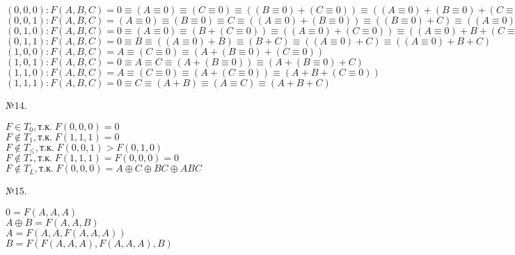 \documentclass[a4paper,12pt]{report} %
\begin{document}
\begin{flushleft}
$ (0,0,0): F(A,B,C) = 0 \equiv (A \equiv 0) \equiv (C \equiv 0) \equiv ((B \equiv 0)+(C \equiv 0)) \equiv ((A \equiv 0)+(B \equiv 0) + (C \equiv 0))$ \\
$ (0,0,1): F(A,B,C) = (A \equiv 0) \equiv (B \equiv 0) \equiv C \equiv ((A \equiv 0)+(B \equiv 0)) \equiv ((B \equiv 0)+ C) \equiv((A \equiv 0) + (B \equiv 0) + C) $ \\
$ (0,1,0): F(A,B,C) = 0 \equiv (A \equiv 0) \equiv (B + (C \equiv 0)) \equiv ((A \equiv 0) + (C \equiv 0)) \equiv ((A \equiv 0) + B + (C \equiv 0))$ \\
$ (0,1,1): F(A,B,C) = 0 \equiv B \equiv ((A \equiv 0)+B)\equiv (B + C)\equiv((A \equiv 0) + C) \equiv ((A \equiv 0)+B+C)$ \\
$ (1,0,0): F(A,B,C) = A \equiv (C \equiv 0) \equiv (A + (B \equiv 0)+ (C \equiv 0))$ \\
$ (1,0,1): F(A,B,C) =0 \equiv A \equiv C \equiv(A + (B \equiv 0)) \equiv (A + (B \equiv 0)+C)$ \\
$ (1,1,0): F(A,B,C) = A \equiv (C \equiv 0) \equiv (A + (C \equiv0)) \equiv (A + B+(C \equiv 0))$ \\
$ (1,1,1): F(A,B,C) = 0 \equiv C \equiv (A+ B)\equiv (A \equiv C) \equiv (A+B+C)$ \\
\end{flushleft}
\begin{center} 
№14.  
\end{center}
\begin{flushleft}
$F \in{T_0}, \text{т.к.}\; F(0,0,0)=0 $ \\
$F \notin{T_1},\text{т.к.}\; F(1,1,1)=0 $ \\
$F \notin{T_\leq}, \text{т.к.}\; F(0,0,1)>F(0,1,0) $ \\
$F \notin{T_*}, \text{т.к.}\; F(1,1,1)=F(0,0,0) = 0 $ \\
$F \notin{T_L}, \text{т.к.}\; F(0,0,0)= A \oplus C \oplus BC \oplus ABC $ \\
\end{flushleft}
\begin{center} 
№15.  
\end{center}
$0=F(A,A,A)$\\
$A\oplus B = F(A,A,B)$\\
$A = F(A, A, F(A,A,A))$\\
$B = F(F(A,A,A),F(A,A,A),B)$\\
\end{document}
